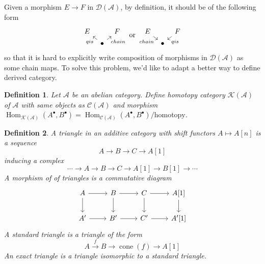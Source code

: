 \documentclass{ctexart}
\newtheorem{definition}{Definition}[section]
\renewcommand{\hom}{\operatorname{Hom}}
\newcommand{\cone}{\operatorname{cone}}
\begin{document}
Given a morphism $E \rightarrow F$ in $\mathcal{D}(\mathscr{A})$, by definition, it should be of the following form
\begin{equation*}
    \begin{tikzcd}[sep = tiny]
        E && F \\
        & \bullet \arrow[ur, "chain" swap] \arrow[ul, "qis"]
    \end{tikzcd}
    \text{ or }
    \begin{tikzcd}[sep = tiny]
        E \arrow[dr, "chain" swap] && F \arrow[dl, "qis"] \\
        & \bullet
    \end{tikzcd}
\end{equation*}
so that it is hard to explicitly write composition of morphisms in $\mathcal{D}(\mathscr{A})$ as some chain maps.
To solve this problem, we'd like to adapt a better way to define derived category.
\begin{definition}
    Let $\mathscr{A}$ be an abelian category.
    Define homotopy category $\mathcal{K}(\mathscr{A})$ of $\mathscr{A}$ with same objects as $\mathcal{C}(\mathscr{A})$ and morphism $\hom_{\mathcal{K}(\mathscr{A})}(A^{\bullet}, B^{\bullet}) = \hom_{\mathcal{C}(\mathscr{A})}(A^{\bullet}, B^{\bullet})/\text{homotopy}$.
\end{definition}
\begin{definition}
    A triangle in an additive category with shift functors $A \mapsto A[n]$ is a sequence
    \begin{equation}
        A \longrightarrow B \longrightarrow C \longrightarrow A[1]
    \end{equation}
    inducing a complex
    \begin{equation}
        \cdots \longrightarrow A \longrightarrow B \longrightarrow C \longrightarrow A[1] \longrightarrow B[1] \longrightarrow \cdots
    \end{equation}
    A morphism of of triangles is a commutative diagram
    \begin{equation}
        \begin{tikzcd}
            A \arrow[r] \arrow[d] &
            B \arrow[r] \arrow[d] &
            C \arrow[r] \arrow[d] &
            A[1] \arrow[d] \\
            A' \arrow[r] &
            B' \arrow[r] &
            C' \arrow[r] &
            A'[1]
        \end{tikzcd}
    \end{equation}
    A standard triangle is a triangle of the form
    \begin{equation}
        A \overset{f}{\longrightarrow} B \longrightarrow \cone(f) \longrightarrow A[1]
    \end{equation}
    An exact triangle is a triangle isomorphic to a standard triangle.
\end{definition}
\end{document}
